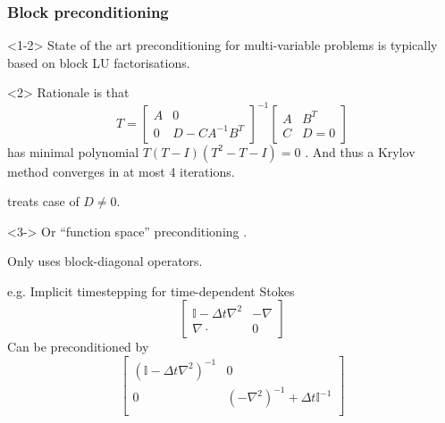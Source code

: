 \documentclass[presentation]{beamer}
\begin{document}
\begin{frame}
  \frametitle{Block preconditioning}
  \begin{onlyenv}<1-2>
    State of the art preconditioning for multi-variable problems is typically
    based on block LU factorisations.

    \begin{uncoverenv}<2>
      Rationale is that
      \begin{equation*}
        T = \begin{bmatrix}
          A & 0 \\
          0 & D - C A^{-1} B^T
        \end{bmatrix}^{-1}
        \begin{bmatrix}
          A & B^T \\
          C & D = 0
        \end{bmatrix}
      \end{equation*}
      has minimal polynomial $T(T - I)(T^2 - T - I) = 0$
      \parencite{Murphy:2000}.  And thus a Krylov method converges in
      at most 4 iterations.

      \textcite{Ipsen:2001} treats case of $D \ne 0$.
    \end{uncoverenv}
    \end{onlyenv}
    \begin{onlyenv}<3->
    Or ``function space'' preconditioning
    \parencite{Kirby:2010,Mardal:2011,Malek:2014}.

    Only uses block-diagonal operators.

    e.g. Implicit timestepping for time-dependent Stokes
    \begin{equation*}
      \begin{bmatrix}
        \mathbb{I} - \Delta t \nabla^2 & -\nabla \\
        \nabla\cdot & 0
      \end{bmatrix}
    \end{equation*}
    Can be preconditioned by
    \begin{equation*}
      \begin{bmatrix}
        (\mathbb{I} - \Delta t\nabla^2)^{-1} & 0 \\
          0 & (-\nabla^2)^{-1} + \Delta t \mathbb{I}^{-1} \\
        \end{bmatrix}
    \end{equation*}
    \end{onlyenv}
\end{frame}
\end{document}
